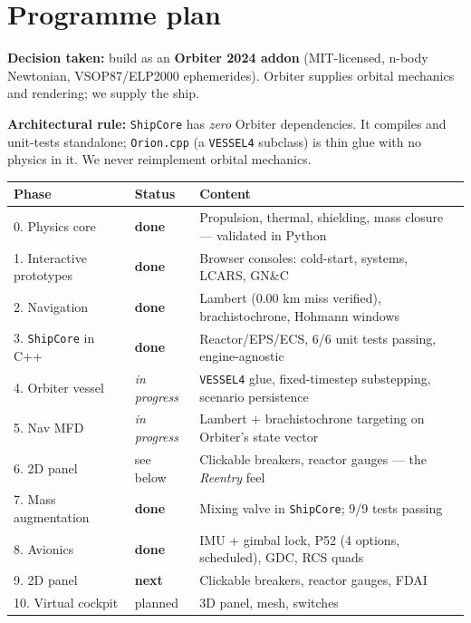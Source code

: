 \documentclass[11pt]{article}
\begin{document}
\section{Programme plan}
\textbf{Decision taken:} build as an \textbf{Orbiter 2024 addon} (MIT-licensed, n-body Newtonian, VSOP87/ELP2000 ephemerides). Orbiter supplies orbital mechanics and rendering; we supply the ship.

\textbf{Architectural rule:} \texttt{ShipCore} has \emph{zero} Orbiter dependencies. It compiles and unit-tests standalone; \texttt{Orion.cpp} (a \texttt{VESSEL4} subclass) is thin glue with no physics in it. We never reimplement orbital mechanics.

\begin{center}\small
\begin{tabular}{@{}llp{7.4cm}@{}}
\toprule
Phase & Status & Content\\
\midrule
0. Physics core & \textbf{done} & Propulsion, thermal, shielding, mass closure --- validated in Python\\
1. Interactive prototypes & \textbf{done} & Browser consoles: cold-start, systems, LCARS, GN\&C\\
2. Navigation & \textbf{done} & Lambert (0.00 km miss verified), brachistochrone, Hohmann windows\\
3. \texttt{ShipCore} in C++ & \textbf{done} & Reactor/EPS/ECS, 6/6 unit tests passing, engine-agnostic\\
4. Orbiter vessel & \emph{in progress} & \texttt{VESSEL4} glue, fixed-timestep substepping, scenario persistence\\
5. Nav MFD & \emph{in progress} & Lambert + brachistochrone targeting on Orbiter's state vector\\
6. 2D panel & see below & Clickable breakers, reactor gauges --- the \emph{Reentry} feel\\
7. Mass augmentation & \textbf{done} & Mixing valve in \texttt{ShipCore}; 9/9 tests passing\\
8. Avionics & \textbf{done} & IMU + gimbal lock, P52 (4 options, scheduled), GDC, RCS quads\\
9. 2D panel & \textbf{next} & Clickable breakers, reactor gauges, FDAI\\
10. Virtual cockpit & planned & 3D panel, mesh, switches\\
\bottomrule
\end{tabular}
\end{center}
\end{document}
